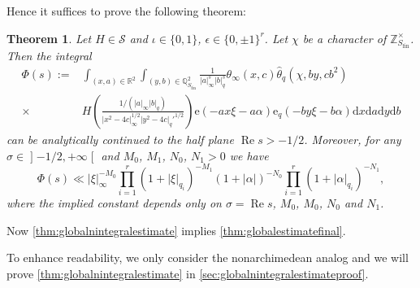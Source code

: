 \documentclass[10pt,oneside,reqno]{amsart}
\newcommand\lopen{\mathopen{]}}
\newcommand\ropen{\mathclose{[}}
\newcommand\rmd{\mathrm{d}}
\newcommand\rme{\mathrm{e}}
\newcommand\cS{\mathcal{S}}
\newcommand\QQ{\mathbb{Q}}
\newcommand\RR{\mathbb{R}}
\newcommand\ZZ{\mathbb{Z}}
\renewcommand\Re{\mathop{\mathrm{Re}}}
\newcommand\fin{\mathrm{fin}}
\newcommand\legendresymbol[2]{\genfrac{(}{)}{}{}{#1}{#2}}
\theoremstyle{THEOREM}
\newtheorem{theorem}{Theorem}[section]
\theoremstyle{DEFINITION}
\theoremstyle{EXERCISE}
\numberwithin{equation}{section}
\begin{document}
Hence it suffices to prove the following theorem:
\begin{theorem}\label{thm:globalnintegralestimate}
Let $H\in \cS$ and $\iota\in \{0,1\}$, $\epsilon\in \{0,\pm 1\}^r$. Let $\chi$ be a character of $\ZZ_{S_\fin}^\times$. Then the integral
\begin{align*}
\Phi(s):=& \int_{(x,a)\in\RR^2}\int_{(y,b)\in\QQ_{S_\fin}^2} \frac{1}{|a|_\infty^{s}|b|_q^{s}} \theta_\infty(x,c)\widehat{\theta}_{q}(\chi,by,cb^2) \\
\times&H\legendresymbol{1/(|a|_\infty|b|_q)}{|x^2-4c|_\infty^{1/2}|y^2- 4c|_q'^{1/2}}\rme(-ax\xi-a\alpha)\rme_{q}(-by\xi-b\alpha)\rmd x\rmd a\rmd y\rmd b
\end{align*}
can be analytically continued to the half plane $\Re s>-1/2$. Moreover, for any $\sigma\in\lopen -1/2,+\infty\ropen$ and $M_0$, $M_1$, $N_0$, $N_1>0$ we have
\[
\Phi(s)\ll |\xi|_\infty^{-M_0}\prod_{i=1}^{r}(1+|\xi|_{q_i})^{-M_1}(1+|\alpha|)^{-N_0} \prod_{i=1}^{r}(1+|\alpha|_{q_i})^{-N_1},
\]
where the implied constant depends only on $\sigma=\Re s$, $M_0$, $M_0$, $N_0$ and $N_1$.
\end{theorem}
Now \autoref{thm:globalnintegralestimate} implies \autoref{thm:globalestimatefinal}.

To enhance readability, we only consider the nonarchimedean analog and we will prove \autoref{thm:globalnintegralestimate} in \autoref{sec:globalnintegralestimateproof}.
\end{document}

